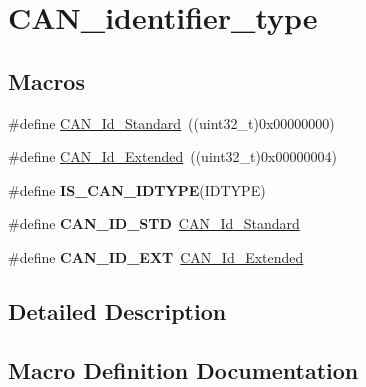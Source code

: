\hypertarget{group___c_a_n__identifier__type}{}\section{C\+A\+N\+\_\+identifier\+\_\+type}
\label{group___c_a_n__identifier__type}
\subsection*{Macros}
\begin{DoxyCompactItemize}
\item 
\#define \hyperlink{group___c_a_n__identifier__type_ga151d9df8a6f361d0a3231593726b5a13}{C\+A\+N\+\_\+\+Id\+\_\+\+Standard}~((uint32\+\_\+t)0x00000000)
\item 
\#define \hyperlink{group___c_a_n__identifier__type_gaf6c5c0b43b968fed17fd90246912b1a7}{C\+A\+N\+\_\+\+Id\+\_\+\+Extended}~((uint32\+\_\+t)0x00000004)
\item 
\#define {\bfseries I\+S\+\_\+\+C\+A\+N\+\_\+\+I\+D\+T\+Y\+P\+E}(I\+D\+T\+Y\+P\+E)
\item 
\hypertarget{group___c_a_n__identifier__type_ga284ca16658deb9d0c21f4ddc6db14833}{}\#define {\bfseries C\+A\+N\+\_\+\+I\+D\+\_\+\+S\+T\+D}~\hyperlink{group___c_a_n__identifier__type_ga151d9df8a6f361d0a3231593726b5a13}{C\+A\+N\+\_\+\+Id\+\_\+\+Standard}\label{group___c_a_n__identifier__type_ga284ca16658deb9d0c21f4ddc6db14833}

\item 
\hypertarget{group___c_a_n__identifier__type_ga5f6fdd1dc3d312af1ac30e2eee15d6f0}{}\#define {\bfseries C\+A\+N\+\_\+\+I\+D\+\_\+\+E\+X\+T}~\hyperlink{group___c_a_n__identifier__type_gaf6c5c0b43b968fed17fd90246912b1a7}{C\+A\+N\+\_\+\+Id\+\_\+\+Extended}\label{group___c_a_n__identifier__type_ga5f6fdd1dc3d312af1ac30e2eee15d6f0}

\end{DoxyCompactItemize}


\subsection{Detailed Description}


\subsection{Macro Definition Documentation}
\hypertarget{group___c_a_n__identifier__type_gaf6c5c0b43b968fed17fd90246912b1a7}{}
